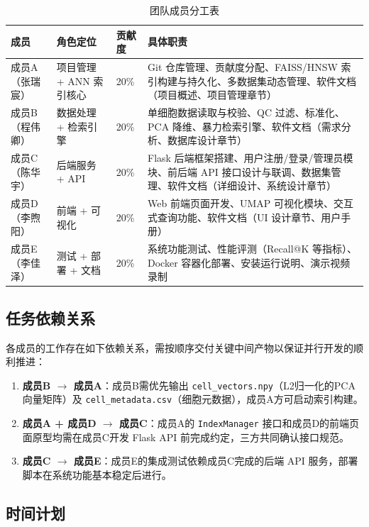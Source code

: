 \documentclass[a4paper]{article}
\begin{document}
\begin{table}[H]
\centering
\small
\caption{团队成员分工表}
\begin{tabularx}{\linewidth}{p{2.5cm}p{2.5cm}p{1.5cm}X}
\toprule
成员 & 角色定位 & 贡献度 & 具体职责 \\
\midrule
成员A（张瑞宸） & 项目管理 + ANN 索引核心 & 20\% & Git 仓库管理、贡献度分配、FAISS/HNSW 索引构建与持久化、多数据集动态管理、软件文档（项目概述、项目管理章节） \\
成员B（程伟卿） & 数据处理 + 检索引擎 & 20\% & 单细胞数据读取与校验、QC 过滤、标准化、PCA 降维、暴力检索引擎、软件文档（需求分析、数据库设计章节） \\
成员C（陈华宇） & 后端服务 + API & 20\% & Flask 后端框架搭建、用户注册/登录/管理员模块、前后端 API 接口设计与联调、数据集管理、软件文档（详细设计、系统设计章节） \\
成员D（李煦阳） & 前端 + 可视化 & 20\% & Web 前端页面开发、UMAP 可视化模块、交互式查询功能、软件文档（UI 设计章节、用户手册） \\
成员E（李佳泽） & 测试 + 部署 + 文档 & 20\% & 系统功能测试、性能评测（Recall@K 等指标）、Docker 容器化部署、安装运行说明、演示视频录制 \\
\bottomrule
\end{tabularx}
\end{table}

\subsection{任务依赖关系}
各成员的工作存在如下依赖关系，需按顺序交付关键中间产物以保证并行开发的顺利推进：

\begin{enumerate}
    \item \textbf{成员B $\rightarrow$ 成员A}：成员B需优先输出 \texttt{cell\_vectors.npy}（L2归一化的PCA向量矩阵）及 \texttt{cell\_metadata.csv}（细胞元数据），成员A方可启动索引构建。
    \item \textbf{成员A + 成员D $\rightarrow$ 成员C}：成员A的 \texttt{IndexManager} 接口和成员D的前端页面原型均需在成员C开发 Flask API 前完成约定，三方共同确认接口规范。
    \item \textbf{成员C $\rightarrow$ 成员E}：成员E的集成测试依赖成员C完成的后端 API 服务，部署脚本在系统功能基本稳定后进行。
\end{enumerate}

\subsection{时间计划}
\end{document}
